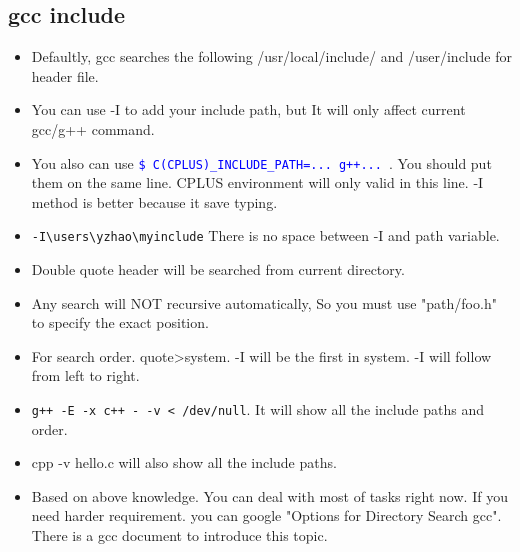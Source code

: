 \documentclass[a4paper,12pt,twoside]{book}
\newcommand{\linuxcommand}[1]{\texttt{\textcolor{blue}{\$ #1 \Pisymbol{psy}{191}}}}
\begin{document}
\subsection{gcc include}
    \begin{itemize}		
    \item Defaultly, gcc searches the following /usr/local/include/ and /user/include for header file.				
	\item You can use -I to add your include path, but It will only affect current gcc/g++ command.

	\item You also can use \linuxcommand{C(CPLUS)\_INCLUDE\_PATH=... g++...}. You should put them on the same line. CPLUS environment will only valid in this line. -I method is better because it save typing.

	\item \verb=-I\users\yzhao\myinclude= There is no space between -I and path variable. 

		\item Double quote header will be searched from current directory. 

		\item Any search will NOT recursive automatically, So you must use "path/foo.h" to specify the exact position. 

		\item For search order. quote>system. -I will be the first in system. -I will follow from left to right.

		\item \verb=g++ -E -x c++ - -v < /dev/null=. It will show all the include paths and order. 

		\item cpp -v hello.c will also show all the include paths. 

		\item Based on above knowledge. You can deal with most of tasks right now. If you need harder requirement. you can google "Options for Directory Search gcc". There is a gcc document to introduce this topic.  
		
			\end{itemize}
\end{document}

